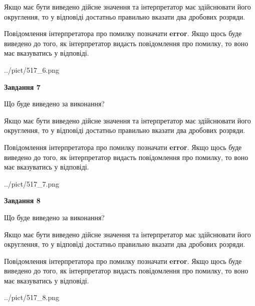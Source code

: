 \documentclass[12pt, ukrainian]{article}
\begin{document}
{\begin {Large}
Якщо має бути виведено дійсне значення та інтерпретатор має здійснювати його округлення, 
то у відповіді достатньо правильно вказати два дробових розряди.

Повідомлення інтерпретатора про помилку позначати \textbf{error}.
Якщо щось буде виведено до того, як інтерпретатор видасть повідомлення про помилку, 
то воно має вказуватись у відповіді. \par

\begin{center}
	{../pict/517_6.png}
\end{center}
\newpage

{\begin {center}\textbf{Завдання 7}\end {center}}\par
Що буде виведено за виконання? \par

Якщо має бути виведено дійсне значення та інтерпретатор має здійснювати його округлення, 
то у відповіді достатньо правильно вказати два дробових розряди.

Повідомлення інтерпретатора про помилку позначати \textbf{error}.
Якщо щось буде виведено до того, як інтерпретатор видасть повідомлення про помилку, 
то воно має вказуватись у відповіді. \par

\begin{center}
	{../pict/517_7.png}
\end{center}
\newpage

{\begin {center}\textbf{Завдання 8}\end {center}}\par
Що буде виведено за виконання? \par

Якщо має бути виведено дійсне значення та інтерпретатор має здійснювати його округлення, 
то у відповіді достатньо правильно вказати два дробових розряди.

Повідомлення інтерпретатора про помилку позначати \textbf{error}.
Якщо щось буде виведено до того, як інтерпретатор видасть повідомлення про помилку, 
то воно має вказуватись у відповіді. \par

\begin{center}
	{../pict/517_8.png}
\end{center}
\newpage


\end{Large}}
\end{document}
